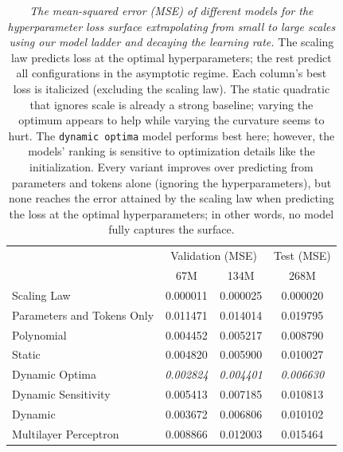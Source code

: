 \begin{table}
    \centering
    \begin{tabular}{lccc}
        \toprule
                                   &  \multicolumn{2}{c}{Validation (MSE)} & \multicolumn{1}{c}{Test (MSE)} \\
                                   &               67M &              134M &                          268M  \\
        \midrule
        Scaling Law                &         0.000011  &         0.000025  &                      0.000020  \\
        \midrule
        Parameters and Tokens Only &         0.011471  &         0.014014  &                      0.019795  \\
        Polynomial                 &         0.004452  &         0.005217  &                      0.008790  \\
        Static                     &         0.004820  &         0.005900  &                      0.010027  \\
        Dynamic Optima             &   \emph{0.002824} &   \emph{0.004401} &                \emph{0.006630} \\
        Dynamic Sensitivity        &         0.005413  &         0.007185  &                      0.010813  \\
        Dynamic                    &         0.003672  &         0.006806  &                      0.010102  \\
        Multilayer Perceptron      &         0.008866  &         0.012003  &                      0.015464  \\
        \bottomrule
    \end{tabular}
    \caption{
        \emph{The mean-squared error (MSE) of different models for the hyperparameter loss surface extrapolating from small to large scales using our model ladder and decaying the learning rate.} The scaling law predicts loss at the optimal hyperparameters; the rest predict all configurations in the asymptotic regime. Each column's best loss is italicized (excluding the scaling law). The static quadratic that ignores scale is already a strong baseline; varying the optimum appears to help while varying the curvature seems to hurt. The \texttt{dynamic optima} model performs best here; however, the models' ranking is sensitive to optimization details like the initialization. Every variant improves over predicting from parameters and tokens alone (ignoring the hyperparameters), but none reaches the error attained by the scaling law when predicting the loss at the optimal hyperparameters; in other words, no model fully captures the surface.
    }
    \label{tab:aggregated-mse_ladder-decay}
\end{table}

